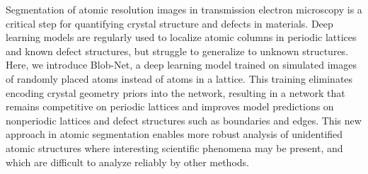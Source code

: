 Segmentation of atomic resolution images in transmission electron microscopy is a critical step for quantifying crystal structure and defects in materials. Deep learning models are regularly used to localize atomic columns in periodic lattices and known defect structures, but struggle to generalize to unknown structures. Here, we introduce Blob-Net, a deep learning model trained on simulated images of randomly placed atoms instead of atoms in a lattice. This training eliminates encoding crystal geometry priors into the network, resulting in a network that remains competitive on periodic lattices and improves model predictions on nonperiodic lattices and defect structures such as boundaries and edges. This new approach in atomic segmentation enables more robust analysis of unidentified atomic structures where interesting scientific phenomena may be present, and which are difficult to analyze reliably by other methods.
